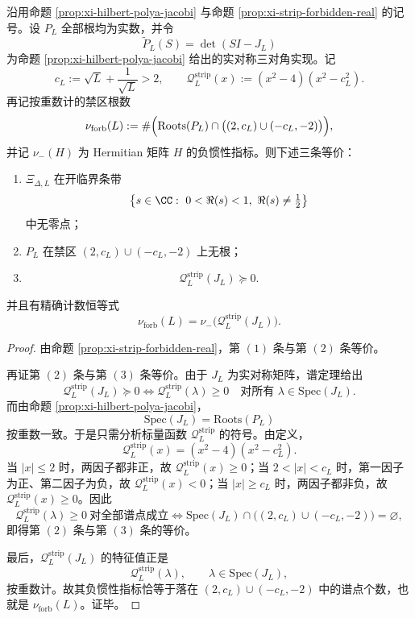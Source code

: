 \begin{theorem}\label{thm:xi-time-part28b-strip-jacobi-quartic-psd}
沿用命题 \ref{prop:xi-hilbert-polya-jacobi} 与命题 \ref{prop:xi-strip-forbidden-real} 的记号。设 \(P_L\) 全部根均为实数，并令
\[
\widetilde P_L(S)=\det(SI-J_L)
\]
为命题 \ref{prop:xi-hilbert-polya-jacobi} 给出的实对称三对角实现。记
\[
c_L:=\sqrt L+\frac{1}{\sqrt L}>2,
\qquad
\mathcal Q_L^{\mathrm{strip}}(x):=(x^2-4)(x^2-c_L^2).
\]
再记按重数计的禁区根数
\[
\nu_{\mathrm{forb}}(L)
:=
\#\Bigl(\mathrm{Roots}(P_L)\cap\bigl((2,c_L)\cup(-c_L,-2)\bigr)\Bigr),
\]
并记 \(\nu_-(H)\) 为 Hermitian 矩阵 \(H\) 的负惯性指标。则下述三条等价：
\begin{enumerate}
  \item \(\Xi_{\Delta,L}\) 在开临界条带
  \[
  \bigl\{s\in\CC:\ 0<\Re(s)<1,\ \Re(s)\neq\tfrac12\bigr\}
  \]
  中无零点；
  \item \(P_L\) 在禁区 \((2,c_L)\cup(-c_L,-2)\) 上无根；
  \item
  \[
  \mathcal Q_L^{\mathrm{strip}}(J_L)\succeq 0.
  \]
\end{enumerate}
并且有精确计数恒等式
\[
\boxed{\;
\nu_{\mathrm{forb}}(L)=\nu_-\!\bigl(\mathcal Q_L^{\mathrm{strip}}(J_L)\bigr).\;}
\]
\end{theorem}
\begin{proof}
由命题 \ref{prop:xi-strip-forbidden-real}，第 \((1)\) 条与第 \((2)\) 条等价。

再证第 \((2)\) 条与第 \((3)\) 条等价。由于 \(J_L\) 为实对称矩阵，谱定理给出
\[
\mathcal Q_L^{\mathrm{strip}}(J_L)\succeq 0
\iff
\mathcal Q_L^{\mathrm{strip}}(\lambda)\ge 0
\quad\text{对所有 }\lambda\in\mathrm{Spec}(J_L).
\]
而由命题 \ref{prop:xi-hilbert-polya-jacobi}，
\[
\mathrm{Spec}(J_L)=\mathrm{Roots}(P_L)
\]
按重数一致。于是只需分析标量函数 \(\mathcal Q_L^{\mathrm{strip}}\) 的符号。由定义，
\[
\mathcal Q_L^{\mathrm{strip}}(x)=(x^2-4)(x^2-c_L^2).
\]
当 \(|x|\le 2\) 时，两因子都非正，故 \(\mathcal Q_L^{\mathrm{strip}}(x)\ge 0\)；当 \(2<|x|<c_L\) 时，第一因子为正、第二因子为负，故 \(\mathcal Q_L^{\mathrm{strip}}(x)<0\)；当 \(|x|\ge c_L\) 时，两因子都非负，故 \(\mathcal Q_L^{\mathrm{strip}}(x)\ge 0\)。因此
\[
\mathcal Q_L^{\mathrm{strip}}(\lambda)\ge 0\ \text{对全部谱点成立}
\iff
\mathrm{Spec}(J_L)\cap\bigl((2,c_L)\cup(-c_L,-2)\bigr)=\varnothing,
\]
即得第 \((2)\) 条与第 \((3)\) 条的等价。

最后，\(\mathcal Q_L^{\mathrm{strip}}(J_L)\) 的特征值正是
\[
\mathcal Q_L^{\mathrm{strip}}(\lambda),
\qquad \lambda\in\mathrm{Spec}(J_L),
\]
按重数计。故其负惯性指标恰等于落在 \((2,c_L)\cup(-c_L,-2)\) 中的谱点个数，也就是 \(\nu_{\mathrm{forb}}(L)\)。证毕。
\end{proof}

